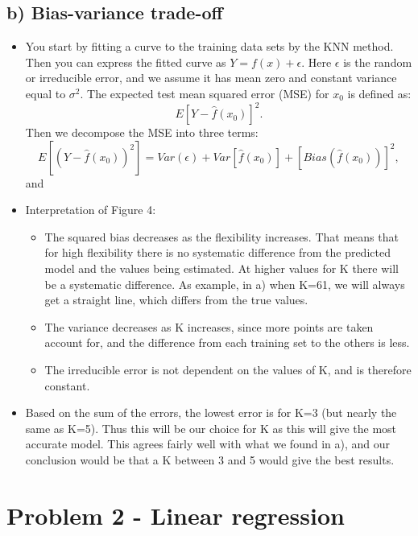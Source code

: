 \documentclass[]{article}
\providecommand{\tightlist}{%
  \setlength{\itemsep}{0pt}\setlength{\parskip}{0pt}}
\begin{document}
\subsection{b) Bias-variance trade-off}\label{b-bias-variance-trade-off}

\begin{itemize}
\tightlist
\item
  You start by fitting a curve to the training data sets by the KNN
  method. Then you can express the fitted curve as
  \(Y = f(x) + \epsilon\). Here \(\epsilon\) is the random or
  irreducible error, and we assume it has mean zero and constant
  variance equal to \(\sigma^2\). The expected test mean squared error
  (MSE) for \(x_0\) is defined as: \[ E[Y- \hat f (x_0)]^2 .\] Then we
  decompose the MSE into three terms:
  \[E[(Y- \hat f (x_0))^2] = Var( \epsilon ) + Var[\hat f  (x_0)] + [Bias(\hat f(x_0))]^2 ,\]
  and
\item
  Interpretation of Figure 4:

  \begin{itemize}
  \tightlist
  \item
    The squared bias decreases as the flexibility increases. That means
    that for high flexibility there is no systematic difference from the
    predicted model and the values being estimated. At higher values for
    K there will be a systematic difference. As example, in a) when
    K=61, we will always get a straight line, which differs from the
    true values.
  \item
    The variance decreases as K increases, since more points are taken
    account for, and the difference from each training set to the others
    is less.
  \item
    The irreducible error is not dependent on the values of K, and is
    therefore constant.
  \end{itemize}
\item
  Based on the sum of the errors, the lowest error is for K=3 (but
  nearly the same as K=5). Thus this will be our choice for K as this
  will give the most accurate model. This agrees fairly well with what
  we found in a), and our conclusion would be that a K between 3 and 5
  would give the best results.
\end{itemize}

\section{Problem 2 - Linear
regression}\label{problem-2---linear-regression}
\end{document}

